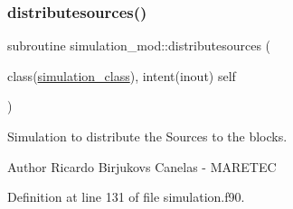 \subsubsection{\texorpdfstring{distributesources()}{distributesources()}}
{\footnotesize\ttfamily subroutine simulation\+\_\+mod\+::distributesources (\begin{DoxyParamCaption}\item[{class(\mbox{\hyperlink{structsimulation__mod_1_1simulation__class}{simulation\+\_\+class}}), intent(inout)}]{self }\end{DoxyParamCaption})\hspace{0.3cm}{\ttfamily [private]}}



Simulation to distribute the Sources to the blocks. 

\begin{DoxyAuthor}{Author}
Ricardo Birjukovs Canelas -\/ M\+A\+R\+E\+T\+EC 
\end{DoxyAuthor}


Definition at line 131 of file simulation.\+f90.


